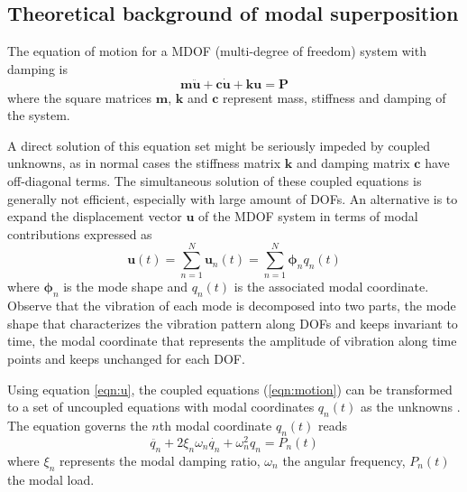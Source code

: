 \subsection{Theoretical background of modal superposition}
\label{subsec:modal_superposition}
 The equation of motion for a MDOF (multi-degree of freedom) system with damping is
\begin{equation}
\mathbf{m\ddot{u}}+\mathbf{c\dot{u}}+\mathbf{ku}=\mathbf{P}
\label{eqn:motion}
\end{equation}
\noindent
where the square matrices $\textbf{m}$, $\textbf{k}$ and $\textbf{c}$ represent mass, stiffness and damping of the system.

A direct solution of this equation set might be seriously impeded by coupled unknowns, as in normal cases the stiffness matrix $\textbf{k}$ and damping matrix $\textbf{c}$ have off-diagonal terms. The simultaneous solution of these coupled equations is generally not efficient, especially with large amount of DOFs. An alternative is to expand the displacement vector $\mathbf{u}$ of the MDOF system in terms of modal contributions expressed as
\begin{equation}
\mathbf{u}(t)=\sum_{n=1}^N\mathbf{u}_n(t)=\sum_{n=1}^N\boldsymbol{\phi}_nq_n(t)
\label{eqn:u}
\end{equation}
\noindent
where $\boldsymbol{\phi}_n$ is the mode shape and $q_n(t)$ is the associated modal coordinate. Observe that the vibration of each mode is decomposed into two parts, the mode shape that characterizes the vibration pattern along DOFs and keeps invariant to time, the modal coordinate that represents the amplitude of vibration along time points and keeps unchanged for each DOF.  

Using equation \ref{eqn:u}, the coupled equations (\ref{eqn:motion}) can be transformed to a set of uncoupled equations with modal coordinates $q_n(t)$ as the unknowns \cite{chopra2007dynamics}. The equation governs the $n$th modal coordinate $q_n(t)$ reads
\begin{equation}
\ddot{q_n}+2\xi_n\omega_n\dot{q_n}+\omega_n^2q_n=P_n(t)
\label{eqn:motion_q}
\end{equation}
\noindent   
where $\xi_n$ represents the modal damping ratio, $\omega_n$ the angular frequency, $P_n(t)$ the modal load. 

